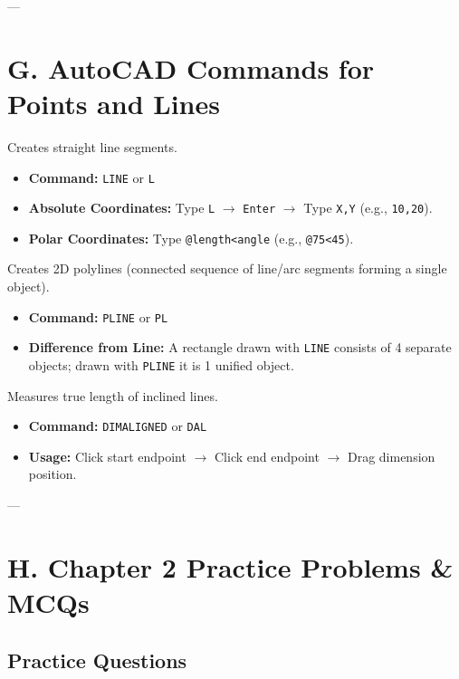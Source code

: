 ---

\section{G. AutoCAD Commands for Points and Lines}

\begin{autocadcmd}[LINE]
Creates straight line segments.
\begin{itemize}
    \item \textbf{Command:} \texttt{LINE} or \texttt{L}
    \item \textbf{Absolute Coordinates:} Type \texttt{L} $\to$ \texttt{Enter} $\to$ Type \texttt{X,Y} (e.g., \texttt{10,20}).
    \item \textbf{Polar Coordinates:} Type \texttt{@length<angle} (e.g., \texttt{@75<45}).
\end{itemize}
\end{autocadcmd}

\begin{autocadcmd}[PLINE]
Creates 2D polylines (connected sequence of line/arc segments forming a single object).
\begin{itemize}
    \item \textbf{Command:} \texttt{PLINE} or \texttt{PL}
    \item \textbf{Difference from Line:} A rectangle drawn with \texttt{LINE} consists of 4 separate objects; drawn with \texttt{PLINE} it is 1 unified object.
\end{itemize}
\end{autocadcmd}

\begin{autocadcmd}[DIMALIGNED]
Measures true length of inclined lines.
\begin{itemize}
    \item \textbf{Command:} \texttt{DIMALIGNED} or \texttt{DAL}
    \item \textbf{Usage:} Click start endpoint $\to$ Click end endpoint $\to$ Drag dimension position.
\end{itemize}
\end{autocadcmd}

---

\section{H. Chapter 2 Practice Problems \& MCQs}

\subsection{Practice Questions}

